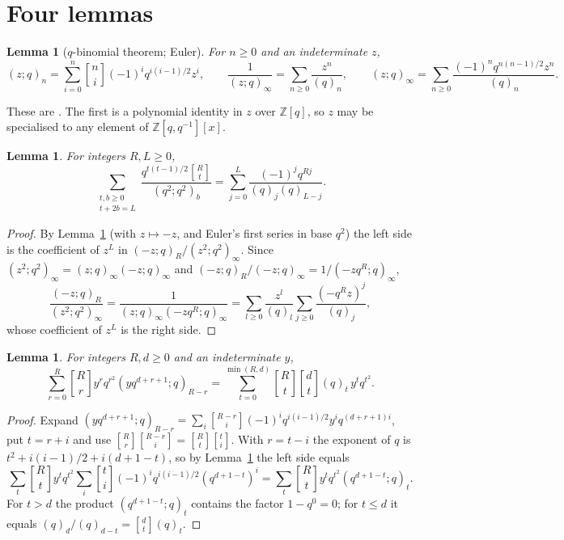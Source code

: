 \documentclass[11pt]{amsart}
\newtheorem{lemma}[theorem]{Lemma}
\theoremstyle{definition}
\numberwithin{equation}{section}
\newcommand{\Z}{\mathbb{Z}}
\newcommand{\qbin}[2]{\genfrac{[}{]}{0pt}{}{#1}{#2}}
\begin{document}
\section{Four lemmas}\label{sec:lemmas}

\begin{lemma}[$q$-binomial theorem; Euler]\label{lem:qbin}
For $n\ge0$ and an indeterminate $z$,
\[
(z;q)_n=\sum_{i=0}^n\qbin ni(-1)^iq^{i(i-1)/2}z^i,\qquad
\frac1{(z;q)_\infty}=\sum_{n\ge0}\frac{z^n}{(q)_n},\qquad
(z;q)_\infty=\sum_{n\ge0}\frac{(-1)^nq^{n(n-1)/2}z^n}{(q)_n}.
\]
\end{lemma}
These are \cite[(3.3.6), (2.2.5), (2.2.6)]{AndrewsBook}. The first is a polynomial identity in $z$
over $\Z[q]$, so $z$ may be specialised to any element of $\Z[q,q^{-1}][x]$.

\begin{lemma}\label{lem:L2}
For integers $R,L\ge0$,
\begin{equation}\label{eq:L2}
\sum_{\substack{t,b\ge0\\t+2b=L}}\frac{q^{t(t-1)/2}\qbin Rt}{(q^2;q^2)_b}
=\sum_{j=0}^{L}\frac{(-1)^jq^{Rj}}{(q)_j(q)_{L-j}} .
\end{equation}
\end{lemma}
\begin{proof}
By Lemma~\ref{lem:qbin} (with $z\mapsto-z$, and Euler's first series in base $q^2$) the left side is
the coefficient of $z^L$ in $(-z;q)_R/(z^2;q^2)_\infty$. Since
$(z^2;q^2)_\infty=(z;q)_\infty(-z;q)_\infty$ and $(-z;q)_R/(-z;q)_\infty=1/(-zq^R;q)_\infty$,
\[
\frac{(-z;q)_R}{(z^2;q^2)_\infty}=\frac1{(z;q)_\infty(-zq^R;q)_\infty}
=\sum_{l\ge0}\frac{z^l}{(q)_l}\sum_{j\ge0}\frac{(-q^Rz)^j}{(q)_j},
\]
whose coefficient of $z^L$ is the right side.
\end{proof}

\begin{lemma}\label{lem:L3}
For integers $R,d\ge0$ and an indeterminate $y$,
\begin{equation}\label{eq:L3}
\sum_{r=0}^{R}\qbin Rr y^rq^{r^2}(yq^{d+r+1};q)_{R-r}=\sum_{t=0}^{\min(R,d)}\qbin Rt\qbin dt(q)_t\,y^tq^{t^2}.
\end{equation}
\end{lemma}
\begin{proof}
Expand $(yq^{d+r+1};q)_{R-r}=\sum_i\qbin{R-r}i(-1)^iq^{i(i-1)/2}y^iq^{(d+r+1)i}$, put $t=r+i$ and use
$\qbin Rr\qbin{R-r}i=\qbin Rt\qbin ti$. With $r=t-i$ the exponent of $q$ is
$t^2+i(i-1)/2+i(d+1-t)$, so by Lemma~\ref{lem:qbin} the left side equals
\[\sum_t\qbin Rty^tq^{t^2}\sum_i\qbin ti(-1)^iq^{i(i-1)/2}(q^{d+1-t})^i=\sum_t\qbin Rty^tq^{t^2}(q^{d+1-t};q)_t.\] For $t>d$ the product $(q^{d+1-t};q)_t$ contains the factor $1-q^0=0$; for
$t\le d$ it equals $(q)_d/(q)_{d-t}=\qbin dt(q)_t$.
\end{proof}
\end{document}
